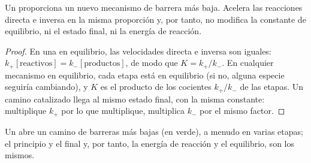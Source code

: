\begin{proposition}\label{prop:b1:elementary-steps:catalysis}
Un  proporciona un nuevo mecanismo de barrera más baja.
Acelera las reacciones directa e inversa en la misma proporción y, por
tanto, no modifica la constante de equilibrio, ni el estado final, ni la
energía de reacción.
\end{proposition}

\begin{proof}
En una  en equilibrio, las velocidades directa e inversa
son iguales: $k_+[\text{reactivos}] = k_-[\text{productos}]$, de modo que
$K = k_+/k_-$. En cualquier mecanismo en equilibrio, cada etapa está en
equilibrio (si no, alguna especie seguiría cambiando), y $K$ es el
producto de los cocientes $k_+/k_-$ de las etapas. Un camino catalizado
llega al mismo estado final, con la misma constante: multiplique $k_+$
por lo que multiplique, multiplica $k_-$ por el mismo factor.
\end{proof}

\begin{omfigure}

{\small Un  abre un camino de barreras más bajas (en verde), a
menudo en varias etapas; el principio y el final y, por tanto, la energía
de reacción y el equilibrio, son los mismos.}
\end{omfigure}

